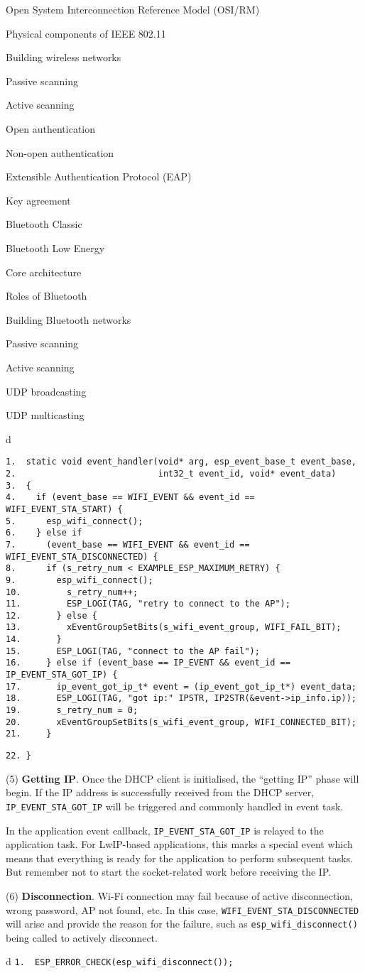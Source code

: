 \documentclass[a4paper,12pt]{book}
\begin{document}
\begin{term}{Open System Interconnection Reference Model (OSI/RM)}
\begin{term}{Physical components of IEEE 802.11}
\begin{term}{Building wireless networks}
\begin{term}{Passive scanning}
\begin{term}{Active scanning}
\begin{term}{Open authentication}
\begin{term}{Non-open authentication}
\begin{term}{Extensible Authentication Protocol (EAP)}
\begin{term}{Key agreement}
\begin{term}{Bluetooth Classic}
\begin{term}{Bluetooth Low Energy}
\begin{term}{Core architecture}
\begin{term}{Roles of Bluetooth}
\begin{term}{Building Bluetooth networks}
\begin{term}{Passive scanning}
\begin{term}{Active scanning}
\begin{term}{UDP broadcasting}
\begin{term}{UDP multicasting}
\begin{tabular}{d}
\vspace{2pt}
\begin{verbatim}
1.  static void event_handler(void* arg, esp_event_base_t event_base,
2.                            int32_t event_id, void* event_data)
3.  {
4.    if (event_base == WIFI_EVENT && event_id == WIFI_EVENT_STA_START) {
5.      esp_wifi_connect();
6.    } else if
7.      (event_base == WIFI_EVENT && event_id == WIFI_EVENT_STA_DISCONNECTED) {
8.      if (s_retry_num < EXAMPLE_ESP_MAXIMUM_RETRY) {
9.        esp_wifi_connect();
10.         s_retry_num++;
11.         ESP_LOGI(TAG, "retry to connect to the AP");
12.       } else {
13.         xEventGroupSetBits(s_wifi_event_group, WIFI_FAIL_BIT);
14.       }
15.       ESP_LOGI(TAG, "connect to the AP fail");
16.     } else if (event_base == IP_EVENT && event_id == IP_EVENT_STA_GOT_IP) {
17.       ip_event_got_ip_t* event = (ip_event_got_ip_t*) event_data;
18.       ESP_LOGI(TAG, "got ip:" IPSTR, IP2STR(&event->ip_info.ip));
19.       s_retry_num = 0;
20.       xEventGroupSetBits(s_wifi_event_group, WIFI_CONNECTED_BIT);
21.     }
\end{verbatim}
\verb|22. }|
\end{tabular}


(5) \textbf{Getting IP}. Once the DHCP client is initialised, the “getting IP” phase will begin. If the IP address is successfully received from the DHCP server, \verb|IP_EVENT_STA_GOT_IP| will be triggered and commonly handled in event task.

In the application event callback, \verb|IP_EVENT_STA_GOT_IP| is relayed to the application task. For LwIP-based applications, this marks a special event which means that everything is ready for the application to perform subsequent tasks. But remember not to start the socket-related work before receiving the IP.

(6) \textbf{Disconnection}. Wi-Fi connection may fail because of active disconnection, wrong password, AP not found, etc. In this case, \verb|WIFI_EVENT_STA_DISCONNECTED| will arise and provide the reason for the failure, such as \verb|esp_wifi_disconnect()| being called to actively disconnect.


\begin{tabular}{d}
\verb|1.  ESP_ERROR_CHECK(esp_wifi_disconnect());|
\end{tabular}



\end{term}
\end{term}
\end{term}
\end{term}
\end{term}
\end{term}
\end{term}
\end{term}
\end{term}
\end{term}
\end{term}
\end{term}
\end{term}
\end{term}
\end{term}
\end{term}
\end{term}
\end{term}
\end{document}
